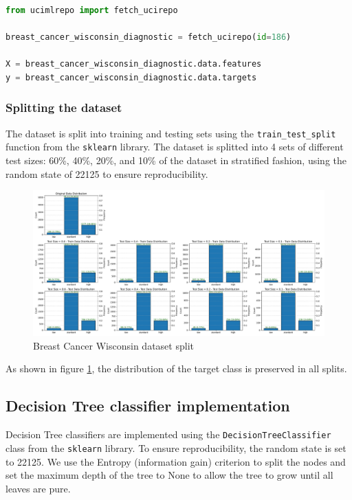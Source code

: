\lstset{style=code}
\begin{lstlisting}[language=Python]
from ucimlrepo import fetch_ucirepo 

breast_cancer_wisconsin_diagnostic = fetch_ucirepo(id=186) 
    
X = breast_cancer_wisconsin_diagnostic.data.features 
y = breast_cancer_wisconsin_diagnostic.data.targets 
\end{lstlisting}

\subsubsection{Splitting the dataset}

The dataset is split into training and testing sets using the \texttt{train\_test\_split} function from the \texttt{sklearn} library. 
The dataset is splitted into 4 sets of different test sizes: 60\%, 40\%, 20\%, and 10\% of the dataset in stratified fashion, using the random state of 22125 to ensure reproducibility.

\begin{figure}[H]
    \centering
    \includegraphics[width=\textwidth]{figures/wine_quality_split.pdf}
    \caption{Breast Cancer Wisconsin dataset split}
    \label{fig:wine_quality_split}
\end{figure}

As shown in figure \ref{fig:wine_quality_split}, the distribution of the target class is preserved in all splits.

\subsection{Decision Tree classifier implementation}

Decision Tree classifiers are implemented using the \texttt{DecisionTreeClassifier} class from the \texttt{sklearn} library. 
To ensure reproducibility, the random state is set to 22125. 
We use the Entropy (information gain) criterion to split the nodes and set the maximum depth of the tree to None to allow the tree to grow until all leaves are pure.


